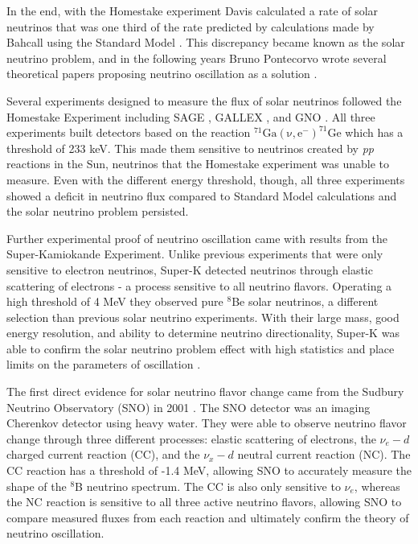 In the end, with the Homestake experiment Davis calculated a rate of solar neutrinos that was one third of the rate predicted by calculations made by Bahcall using the Standard Model \cite{Davis}. 
This discrepancy became known as the solar neutrino problem, and in the following years Bruno Pontecorvo wrote several theoretical papers proposing neutrino oscillation as a solution \cite{Pont1968,Pont1977}.

Several experiments designed to measure the flux of solar neutrinos followed the Homestake Experiment including SAGE \cite{Abdurashitov:1994bc}, GALLEX \cite{Hampel:1998xg}, and GNO \cite{Altmann:2000ft,Bellotti:2001ta}.
All three experiments built detectors based on the reaction $\mathrm{^{71}Ga(\nu,e^{-})^{71}Ge}$ which has a threshold of 233 keV.
This made them sensitive to neutrinos created by \textit{pp} reactions in the Sun, neutrinos that the Homestake experiment was unable to measure.
Even with the different energy threshold, though, all three experiments showed a deficit in neutrino flux compared to Standard Model calculations and the solar neutrino problem persisted.

Further experimental proof of neutrino oscillation came with results from the Super-Kamiokande Experiment. Unlike previous experiments that were only sensitive to electron neutrinos, Super-K detected neutrinos through elastic scattering of electrons - a process sensitive to all neutrino flavors.
Operating a high threshold of 4 MeV they observed pure $^{8}$Be solar neutrinos, a different selection than previous solar neutrino experiments.
With their large mass, good energy resolution, and ability to determine neutrino directionality, Super-K was able to confirm the solar neutrino problem effect with high statistics and place limits on the parameters of oscillation \cite{SuperKOsc}.

The first direct evidence for solar neutrino flavor change came from the Sudbury Neutrino Observatory (SNO) in 2001 \cite{SNO,SNOOsc}. 
The SNO detector was an imaging Cherenkov detector using heavy water.
They were able to observe neutrino flavor change through three different processes: elastic scattering of electrons, the $\nu_e - d$ charged current reaction (CC), and the $\nu_x - d$ neutral current reaction (NC).
The CC reaction has a threshold of -1.4 MeV, allowing SNO to accurately measure the shape of the $^{8}$B neutrino spectrum.
The CC is also only sensitive to $\nu_{e}$, whereas the NC reaction is sensitive to all three active neutrino flavors, allowing SNO to compare measured fluxes from each reaction and ultimately confirm the theory of neutrino oscillation.

